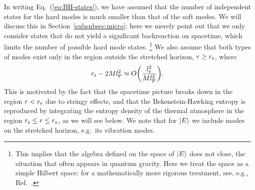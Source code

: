 \documentclass[12pt]{article}
\begin{document}
In writing Eq.~(\ref{eq:BH-states}), we have assumed that 
the number of independent states for the hard modes is much 
smaller than that of the soft modes.  We will discuss this in 
Section~\ref{subsubsec:micro}; here we merely point out that we 
only consider states that do not yield a significant backreaction 
on spacetime, which limits the number of possible hard mode states.%
\footnote{This implies that the algebra defined on the space of 
 $| E \rangle$ does not close, the situation that often appears in 
 quantum gravity.  Here we treat the space as a simple Hilbert 
 space; for a mathematically more rigorous treatment, see, 
 e.g., Ref.~\cite{Ghosh:2017gtw}.}
We also assume that both types of modes exist only in the region 
outside the stretched horizon, $r \geq r_{\rm s}$, where
%
\begin{equation}
  r_{\rm s} - 2 M l_{\rm P}^2 
  \approx O\biggl(\frac{l_{\rm s}^2}{M l_{\rm P}^2}\biggr).
\label{eq:stretched}
\end{equation}
%
This is motivated by the fact that the spacetime picture breaks 
down in the region $r < r_{\rm s}$ due to stringy effects, and that 
the Bekenstein-Hawking entropy is reproduced by integrating the 
entropy density of the thermal atmosphere in the region $r_{\rm s} 
\leq r \leq r_{\rm z}$, as we will see below.  We note that for 
$| E \rangle$ we include modes on the stretched horizon, e.g.\ its 
vibration modes.
\end{document}
